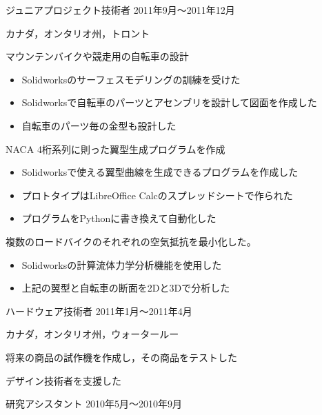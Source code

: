 \documentclass[10pt, a4paper]{article}
\begin{document}
\begin{outerlist}
\item[\href{http://www.kqbikes.com/}{\parbox[t]{3cm}{\raggedleft Kevin Quan Studios有限会社}}]{ジュニアプロジェクト技術者} \hfill {2011年9月〜2011年12月}

\vspace{-\baselineskip}    
\hfill カナダ，オンタリオ州，トロント
  \begin{innerlist}
  \item マウンテンバイクや競走用の自転車の設計
  \begin{itemize}
    \item Solidworksのサーフェスモデリングの訓練を受けた
    \item Solidworksで自転車のパーツとアセンブリを設計して図面を作成した
    \item 自転車のパーツ毎の金型も設計した
  \end{itemize}
  \item NACA 4桁系列に則った翼型生成プログラムを作成
  \begin{itemize}
    \item Solidworksで使える翼型曲線を生成できるプログラムを作成した
    \item プロトタイプはLibreOffice Calcのスプレッドシートで作られた
    \item プログラムをPythonに書き換えて自動化した
  \end{itemize}
  \item 複数のロードバイクのそれぞれの空気抵抗を最小化した。
  \begin{itemize}
    \item Solidworksの計算流体力学分析機能を使用した
    \item 上記の翼型と自転車の断面を2Dと3Dで分析した
  \end{itemize}
  \end{innerlist}

\item[\href{http://www.intellimec.com/}{\parbox[t]{3cm}{\raggedleft Intelligent Mechatronics Systems株式会社}}]{ハードウェア技術者} \hfill {2011年1月〜2011年4月}

\vspace{-2\baselineskip}
\hfill カナダ，オンタリオ州，ウォータールー
  \begin{innerlist}
  \item 将来の商品の試作機を作成し，その商品をテストした
  \item デザイン技術者を支援した
  \end{innerlist}

\item[\href{http://rpl.uwaterloo.ca/}{\parbox[t]{3cm}{\raggedleft ウォータールー大学\\マルチスケール\\積層造形研究室}}]{研究アシスタント} \hfill {2010年5月〜2010年9月}


\end{outerlist}
\end{document}
